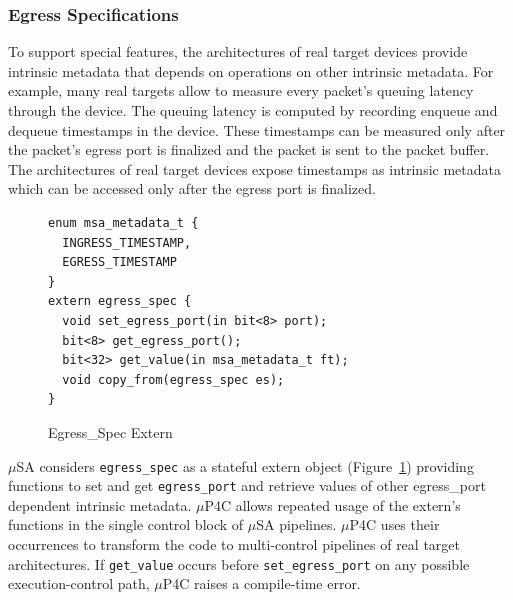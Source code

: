 \subsubsection{Egress Specifications}
To support special features, the architectures of real target devices provide intrinsic metadata  that depends on operations on other intrinsic metadata.
For example,  many real targets allow to measure every packet's queuing latency through the device.
The queuing latency is computed by recording enqueue and dequeue timestamps in the device.
These timestamps can be measured only after the packet's egress port is finalized and the packet is sent to the packet buffer.
The architectures of real target devices expose timestamps as intrinsic metadata which can be accessed only after the egress port is finalized.
\begin{figure}[!h]
\begin{lstlisting}[frame=none]
enum msa_metadata_t {
  INGRESS_TIMESTAMP,
  EGRESS_TIMESTAMP
}
extern egress_spec {
  void set_egress_port(in bit<8> port);
  bit<8> get_egress_port();
  bit<32> get_value(in msa_metadata_t ft);
  void copy_from(egress_spec es);
}
\end{lstlisting}
\caption{Egress\_Spec Extern}
\label{fig:msa-egress-spec-extern}
\end{figure}
$\mu$SA considers \texttt{egress\_spec} as a stateful extern object (Figure~\ref{fig:msa-egress-spec-extern}) providing functions to set and get \texttt{egress\_port} and retrieve values of other egress\_port dependent intrinsic metadata.
$\mu$P4C allows repeated usage of the extern's functions in the single control block of $\mu$SA pipelines.
$\mu$P4C uses their occurrences to transform the code to multi-control pipelines of real target architectures.
If \texttt{get\_value} occurs before \texttt{set\_egress\_port} on any possible execution-control path, $\mu$P4C raises a compile-time error.

